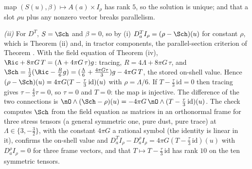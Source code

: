 map $(S(u), \beta) \mapsto A(a) \times I_{\rho}$ has rank $5$, so the solution is unique; and that a slot $\rho u$ plus any nonzero vector breaks parallelism.

\emph{(ii)} For $D^{T}$, $S = \Sch$ and $\beta = 0$, so by (i) $D^{T}_{a}I_{\rho} = (\rho - \Sch)(u)$ for constant $\rho$, which is Theorem (ii) and, in tractor components, the parallel-section criterion of Theorem . With the field equation of Theorem (iv), $\Ric + 8\pi G\,T = (\Lambda + 4\pi G\,\tau)g$: tracing, $R = 4\Lambda + 8\pi G\,\tau$, and $\Sch = \tfrac12(\Ric - \tfrac{R}{6}g) = (\tfrac{\Lambda}{6} + \tfrac{4\pi G\tau}{3})g - 4\pi G\,T$, the stored on-shell value. Hence $(\rho - \Sch)(u) = 4\pi G(T - \tfrac{\tau}{3}\,\mathrm{id})(u)$ with $\rho = \Lambda/6$. If $T - \tfrac{\tau}{3}\,\mathrm{id} = 0$ then tracing gives $\tau - \tfrac43\tau = 0$, so $\tau = 0$ and $T = 0$: the map is injective. The difference of the two connections is $\nO \wedge (\Sch - \rho)(u) = -4\pi G\,\nO \wedge (T - \tfrac{\tau}{3}\,\mathrm{id})(u)$. The check computes $\Sch$ from the field equation as matrices in an orthonormal frame for three stress tensors (a general symmetric one, pure dust, pure trace) at $\Lambda \in \{3, -\tfrac32\}$, with the constant $4\pi G$ a rational symbol (the identity is linear in it), confirms the on-shell value and $D^{T}_{a}I_{\rho} - D^{\rho}_{a}I_{\rho} = 4\pi G(T - \tfrac{\tau}{3}\,\mathrm{id})(u)$ with $D^{\rho}_{a}I_{\rho} = 0$ for three frame vectors, and that $T \mapsto T - \tfrac{\tau}{3}\,\mathrm{id}$ has rank $10$ on the ten symmetric tensors.

